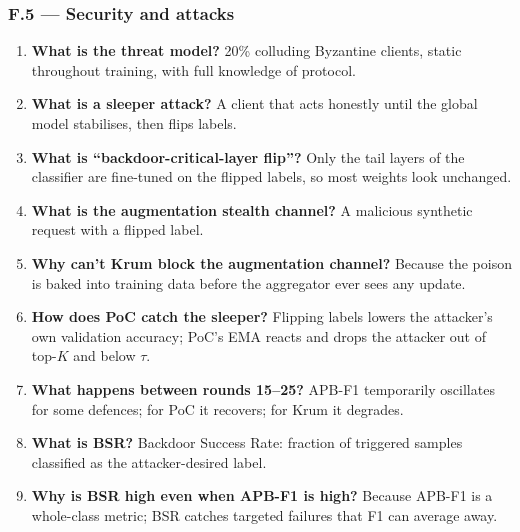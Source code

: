 \documentclass[11pt,a4paper]{article}
\begin{document}
\subsubsection{F.5 --- Security and attacks}
\begin{enumerate}
\item \textbf{What is the threat model?} 20\% colluding Byzantine clients, static throughout training, with full knowledge of protocol.
\item \textbf{What is a sleeper attack?} A client that acts honestly until the global model stabilises, then flips labels.
\item \textbf{What is ``backdoor-critical-layer flip''?} Only the tail layers of the classifier are fine-tuned on the flipped labels, so most weights look unchanged.
\item \textbf{What is the augmentation stealth channel?} A malicious synthetic request with a flipped label.
\item \textbf{Why can't Krum block the augmentation channel?} Because the poison is baked into training data before the aggregator ever sees any update.
\item \textbf{How does PoC catch the sleeper?} Flipping labels lowers the attacker's own validation accuracy; PoC's EMA reacts and drops the attacker out of top-$K$ and below $\tau$.
\item \textbf{What happens between rounds 15--25?} APB-F1 temporarily oscillates for some defences; for PoC it recovers; for Krum it degrades.
\item \textbf{What is BSR?} Backdoor Success Rate: fraction of triggered samples classified as the attacker-desired label.
\item \textbf{Why is BSR high even when APB-F1 is high?} Because APB-F1 is a whole-class metric; BSR catches targeted failures that F1 can average away.
\end{enumerate}
\end{document}
